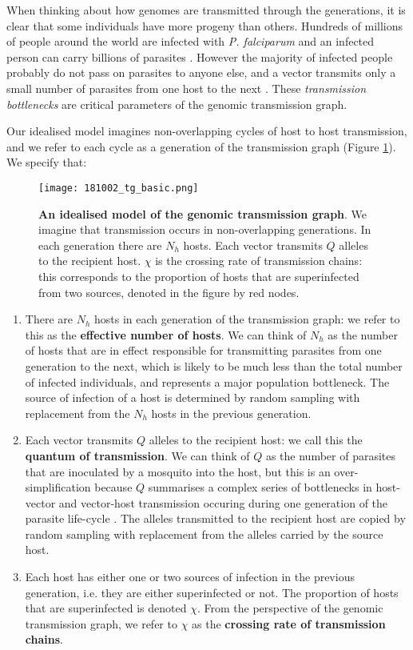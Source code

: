\documentclass[_main.tex]{subfiles}
\begin{document}
When thinking about how genomes are transmitted through the generations, it is clear that some individuals have more progeny than others.  Hundreds of millions of people around the world are infected with \textit{P. falciparum} and an infected person can carry billions of parasites \cite{WHO2022}.  However the majority of infected people probably do not pass on parasites to anyone else, and a vector transmits only a small number of parasites from one host to the next \cite{Graumans2020}.  These \textit{transmission bottlenecks} are critical parameters of the genomic transmission graph.

Our idealised model imagines non-overlapping cycles of host to host transmission, and we refer to each cycle as a generation of the transmission graph (Figure \ref{fig:graph_2}).  We specify that: 

\begin{figure}[ht]
\centering
\texttt{[image: 181002\_tg\_basic.png]}
\caption{\textbf{An idealised model of the genomic transmission graph}.  We imagine that transmission occurs in non-overlapping generations.  In each generation there are $N_h$ hosts.  Each vector transmits $Q$ alleles to the recipient host.  $\chi$ is the crossing rate of transmission chains: this corresponds to the proportion of hosts that are superinfected from two sources, denoted in the figure by red nodes.}
\label{fig:graph_2}
\end{figure}

\begin{enumerate}

\item  There are $N_h$ hosts in each generation of the transmission graph: we refer to this as the \textbf{effective number of hosts}.  We can think of $N_h$ as the number of hosts that are in effect responsible for transmitting parasites from one generation to the next, which is likely to be much less than the total number of infected individuals, and represents a major population bottleneck.  The source of infection of a host is determined by random sampling with replacement from the $N_h$ hosts in the previous generation.

\item Each vector transmits $Q$ alleles to the recipient host: we call this the \textbf{quantum of transmission}.  We can think of $Q$ as the number of parasites that are inoculated by a mosquito into the host, but this is an over-simplification because $Q$ summarises a complex series of bottlenecks in host-vector and vector-host transmission occuring during one generation of the parasite life-cycle \cite{Chan2013,Graumans2020}.  The alleles transmitted to the recipient host are copied by random sampling with replacement from the alleles carried by the source host.

\item Each host has either one or two sources of infection in the previous generation, i.e. they are either superinfected or not.  The proportion of hosts that are superinfected is denoted $\chi$.  From the perspective of the genomic transmission graph, we refer to $\chi$ as the \textbf{crossing rate of transmission chains}. 

\end{enumerate}
\end{document}
